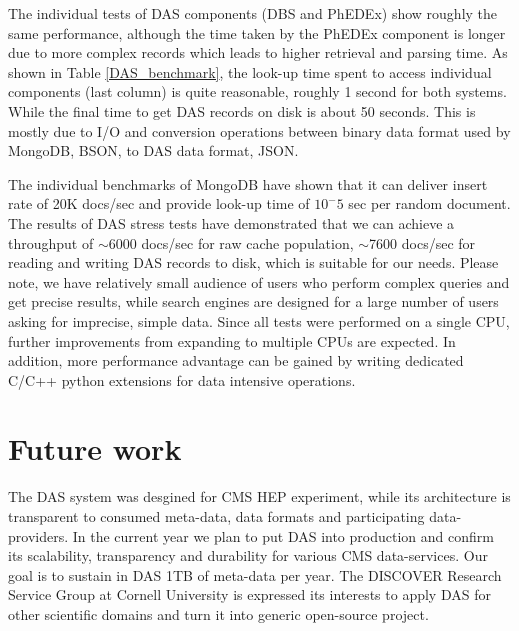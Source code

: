 \documentclass[1p,times]{elsarticle}
\begin{document}
The individual tests of DAS components (DBS and PhEDEx) show roughly 
the same performance, although the time taken by the PhEDEx component is longer
due to more complex records which leads to higher retrieval and parsing time. 
As shown in Table \ref{DAS_benchmark},
the look-up time spent to access individual components (last column) is quite
reasonable, roughly 1 second for both systems. While the final time to
get DAS records on disk is about 50 seconds. This is mostly due to I/O and
conversion operations between binary data format used by MongoDB, BSON, to DAS
data format, JSON.

The individual benchmarks of MongoDB have shown that it can deliver insert rate of
20K docs/sec and provide look-up time of $10^-5$ sec per random document.
The results of DAS stress tests have demonstrated that we can achieve a throughput of
$\sim$6000 docs/sec for raw cache population, 
$\sim$7600 docs/sec for reading and writing DAS records to disk,
which is suitable for our needs. 
Please note, we have relatively small audience of users
who perform complex queries and get precise results, while search 
engines are designed for a large number of users asking for imprecise, simple data.
Since all tests were performed on a single CPU, further improvements from
expanding to multiple CPUs are expected. In addition, more
performance advantage can be gained by writing dedicated C/C++
python extensions for data intensive operations.

\section{Future work}
The DAS system was desgined for CMS HEP experiment, while its architecture is
transparent to consumed meta-data, data formats and participating data-providers. 
In the current year we plan to put DAS into production and confirm its scalability, 
transparency and durability for various CMS data-services. Our goal is to sustain 
in DAS 1TB of meta-data per year. The DISCOVER Research Service Group at Cornell 
University \cite{DRSG} is expressed its interests to apply DAS for other 
scientific domains and turn it into generic open-source project.
\end{document}
